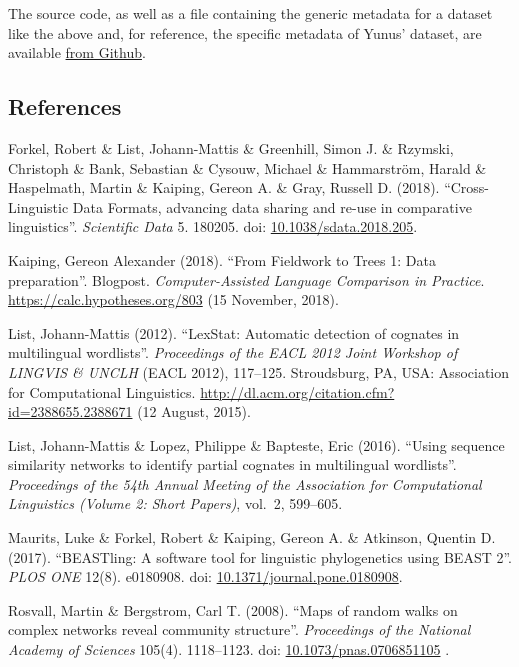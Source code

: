 \documentclass[
  a4paper,
  14pt,
  oneside,
  tablecaptionabove
]{scrbook}
\begin{document}
The source code, as well as a file containing the generic metadata for a
dataset like the above and, for reference, the specific metadata of
Yunus' dataset, are available
\href{https://github.com/Anaphory/matrix_to_beastling}{from Github}. 

\subsection*{References}

\nopagebreak\hangindent=0.7cm {\small Forkel, Robert \& List, Johann-Mattis \& Greenhill, Simon J. \&
Rzymski, Christoph \& Bank, Sebastian \& Cysouw, Michael \& Hammarström,
Harald \& Haspelmath, Martin \& Kaiping, Gereon A. \& Gray, Russell D.
(2018). ``Cross-Linguistic Data Formats, advancing data sharing and re-use
in comparative linguistics''. \emph{Scientific Data} 5. 180205. doi:
\href{https://doi.org/10.1038/sdata.2018.205}{10.1038/sdata.2018.205}. 
}

\nopagebreak\hangindent=0.7cm {\small Kaiping, Gereon Alexander (2018). ``From Fieldwork to Trees 1: Data
preparation''. Blogpost. \emph{Computer-Assisted Language Comparison
in Practice}.  \url{https://calc.hypotheses.org/803} (15 November,
2018). }

\nopagebreak\hangindent=0.7cm {\small List, Johann-Mattis (2012). ``LexStat: Automatic detection of cognates in
multilingual wordlists''. \emph{Proceedings of the EACL 2012 Joint
Workshop of LINGVIS \& UNCLH} (EACL 2012), 117--125. Stroudsburg, PA,
USA: Association for Computational Linguistics.
\url{http://dl.acm.org/citation.cfm?id=2388655.2388671} (12 August,
2015). }

\nopagebreak\hangindent=0.7cm {\small List, Johann-Mattis \& Lopez, Philippe \& Bapteste, Eric (2016). ``Using
sequence similarity networks to identify partial cognates in
multilingual wordlists''. \emph{Proceedings of the 54th Annual Meeting of
the Association for Computational Linguistics (Volume 2: Short Papers)},
vol.~2, 599--605. }

\nopagebreak\hangindent=0.7cm {\small Maurits, Luke \& Forkel, Robert \& Kaiping, Gereon A. \& Atkinson,
Quentin D. (2017). ``BEASTling: A software tool for linguistic phylogenetics
using BEAST 2''. \emph{PLOS ONE} 12(8). e0180908. doi:
\href{https://doi.org/10.1371/journal.pone.0180908}{10.1371/journal.pone.0180908}.
}

\nopagebreak\hangindent=0.7cm {\small Rosvall, Martin \& Bergstrom, Carl T. (2008). ``Maps of random walks on
complex networks reveal community structure''. \emph{Proceedings of the
National Academy of Sciences} 105(4). 1118--1123. doi:
\href{https://doi.org/10.1073/pnas.0706851105}{10.1073/pnas.0706851105}
. }
\end{document}
